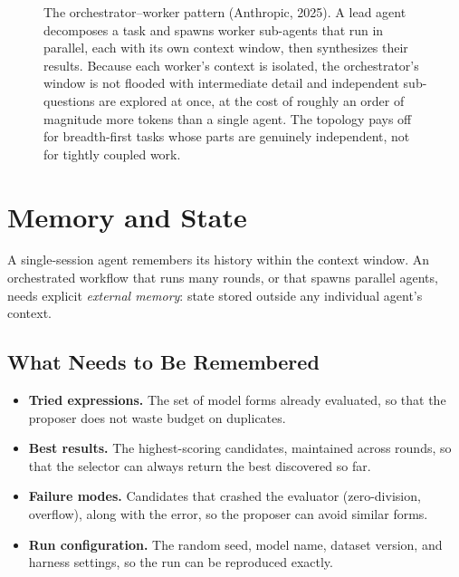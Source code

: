 \begin{figure}[htb!]
\begin{center}

\caption{The orchestrator--worker pattern (Anthropic, 2025).
A lead agent decomposes a task and spawns worker sub-agents that run in parallel, each with its own context window, then synthesizes their results.
Because each worker's context is isolated, the orchestrator's window is not flooded with intermediate detail and independent sub-questions are explored at once, at the cost of roughly an order of magnitude more tokens than a single agent.
The topology pays off for breadth-first tasks whose parts are genuinely independent, not for tightly coupled work.}
\label{figure:OrchestratorWorker}
\end{center}
\end{figure}

\section{Memory and State}
\label{section:MemoryState}

A single-session agent remembers its history within the context window.
An orchestrated workflow that runs many rounds, or that spawns parallel agents, needs explicit \emph{external memory}: state stored outside any individual agent's context.

\subsection{What Needs to Be Remembered}

\begin{itemize}
\item \textbf{Tried expressions.} The set of model forms already evaluated, so that the proposer does not waste budget on duplicates.
\item \textbf{Best results.} The highest-scoring candidates, maintained across rounds, so that the selector can always return the best discovered so far.
\item \textbf{Failure modes.} Candidates that crashed the evaluator (zero-division, overflow), along with the error, so the proposer can avoid similar forms.
\item \textbf{Run configuration.} The random seed, model name, dataset version, and harness settings, so the run can be reproduced exactly.
\end{itemize}


